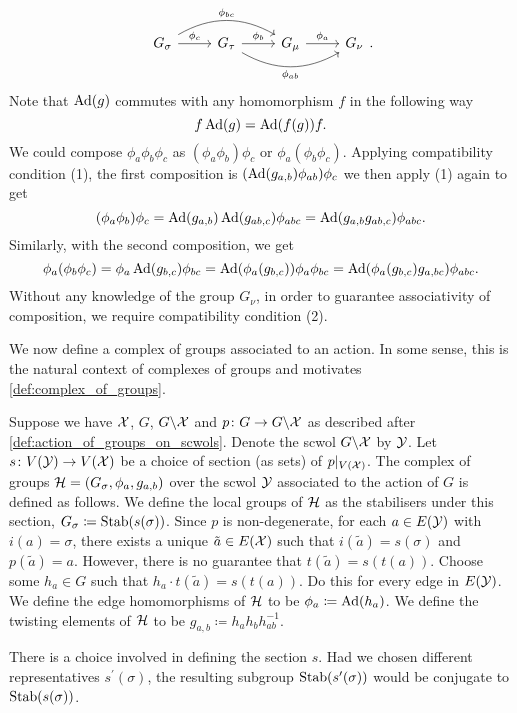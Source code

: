 \[
	\begin{tikzcd}
		G_\sigma \ar[r, "\phi_c"] \ar[rr, bend left, "\phi_{bc}"] & G_\tau \ar[r, "\phi_b"] \ar[rr, bend right, "\phi_{ab}"'] & G_\mu \ar[r, "\phi_a"] & G_\nu
	\end{tikzcd}
	.\]
Note that $\operatorname{Ad}(g)$ commutes with any homomorphism $f$ in the following way
\[
	f\operatorname{Ad}(g) = \operatorname{Ad}(f(g))f
	.\]
We could compose $\phi_a\phi_b\phi_c$ as $(\phi_a\phi_b)\phi_c$ or $\phi_a(\phi_b\phi_c)$.
Applying compatibility condition (1), the first composition is $(\operatorname{Ad}(g_{a,b})\phi_{ab})\phi_c$ we then apply (1) again to get
\[
	(\phi_a\phi_b)\phi_c = \operatorname{Ad}(g_{a,b})\operatorname{Ad}(g_{ab,c})\phi_{abc} = \operatorname{Ad}(g_{a,b}g_{ab,c})\phi_{abc}
	.\]
Similarly, with the second composition, we get
\[
	\phi_a(\phi_b\phi_c) = \phi_a\operatorname{Ad}(g_{b,c})\phi_{bc} = \operatorname{Ad}(\phi_a(g_{b,c}))\phi_a\phi_{bc} = \operatorname{Ad}(\phi_a(g_{b,c})g_{a,bc})\phi_{abc}
	.\]
Without any knowledge of the group $G_\nu$, in order to guarantee associativity of composition, we require compatibility condition (2).

We now define a complex of groups associated to an action.
In some sense, this is the natural context of complexes of groups and motivates  \cref{def:complex_of_groups}.
\begin{definition}
	Suppose we have $\mathcal{X}$, $G$, $G \backslash \mathcal{X}$ and $p \colon G \to G \backslash \mathcal{X}$ as described after \cref{def:action_of_groups_on_scwols}.
	Denote the scwol $G \backslash \mathcal{X}$ by $\mathcal{Y}$.
	Let $s \colon V(\mathcal{Y}) \to V(\mathcal{X})$ be a choice of section (as sets) of $p|_{V(\mathcal{X})}$.
	The complex of groups $\mathcal{H} = (G_\sigma, \phi_a, g_{a,b})$ over the scwol $\mathcal{Y}$ associated to the action of $G$ is defined as follows.
	We define the local groups of $\mathcal{H}$ as the stabilisers under this section, $G_\sigma \coloneqq \operatorname{Stab}(s(\sigma))$.
	Since $p$ is non-degenerate, for each $a \in E(\mathcal{Y})$ with $i(a) = \sigma$, there exists a unique $\tilde{a} \in E(\mathcal{X})$ such that $i(\tilde{a}) = s(\sigma)$ and $p(\tilde{a}) = a$.
	However, there is no guarantee that $t(\tilde{a}) = s(t(a))$.
	Choose some $h_a \in G$ such that $h_a \cdot t(\tilde{a}) = s(t(a))$.
	Do this for every edge in $E(\mathcal{Y})$.
	We define the edge homomorphisms of $\mathcal{H}$ to be $\phi_a \coloneqq \operatorname{Ad}(h_a)$.
	We define the twisting elements of $\mathcal{H}$ to be $g_{a,b} \coloneq h_ah_bh_{ab}^{-1}$.
	\label{def:complex_of_groups_from_action}
\end{definition}

There is a choice involved in defining the section $s$.
Had we chosen different representatives $s^\prime(\sigma)$, the resulting  subgroup $\operatorname{Stab}(s^\prime(\sigma))$ would be conjugate to $\operatorname{Stab}(s(\sigma))$.

